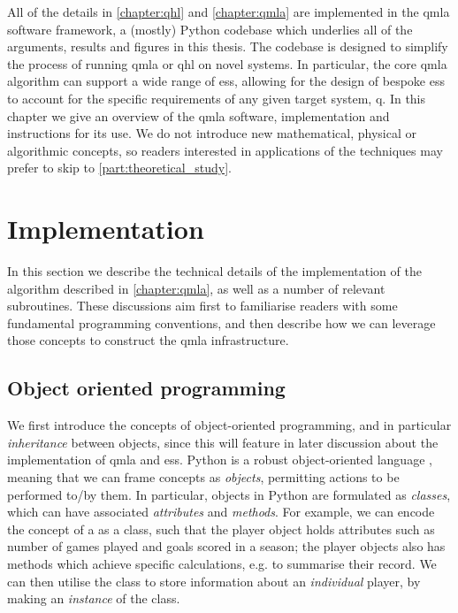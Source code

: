 

All of the details in \cref{chapter:qhl} and \cref{chapter:qmla} are implemented in the \gls{qmla}
    software framework, a (mostly) Python codebase which underlies all of the 
    arguments, results and figures in this thesis. 
The codebase is designed to simplify the process of running \gls{qmla} or \gls{qhl}
    on novel systems.
In particular, the core \gls{qmla} algorithm can support a wide range of \glspl{es}, 
    allowing for the design of bespoke \glspl{es} to account for the specific requirements 
    of any given target system, \gls{q}. 
In this chapter we give an overview of the \gls{qmla} software, 
    implementation and instructions for its use. 
We do not introduce new mathematical, physical or algorithmic concepts, 
    so readers interested in applications of the techniques may prefer to skip to \cref{part:theoretical_study}.

\section{Implementation}
In this section we describe the technical details of the implementation of the 
    algorithm described in \cref{chapter:qmla}, as well as a number of relevant subroutines. 
These discussions aim first to familiarise readers with some fundamental programming conventions,
    and then describe how we can leverage those concepts to construct the \gls{qmla} infrastructure.

\subsection{Object oriented programming}
We first introduce the concepts of object-oriented programming, 
    and in particular \emph{inheritance} between objects, 
    since this will feature in later discussion about the implementation of \gls{qmla}
    and \glspl{es}. 
Python is a robust object-oriented language \cite{python-manual}, meaning that we can frame 
    concepts as \emph{objects}, permitting actions to be performed to/by them. 
In particular, objects in Python are formulated as \emph{classes}, 
    which can have associated \emph{attributes} and \emph{methods}. 
For example, we can encode the concept of a  as a class,
    such that the player object holds attributes such as number of games played and goals scored in a season;
    the player objects also has methods which achieve specific calculations, 
    e.g. to summarise their record.
We can then utilise the  class to store information about an \emph{individual} player, 
    by making an \emph{instance} of the class.
\par 

